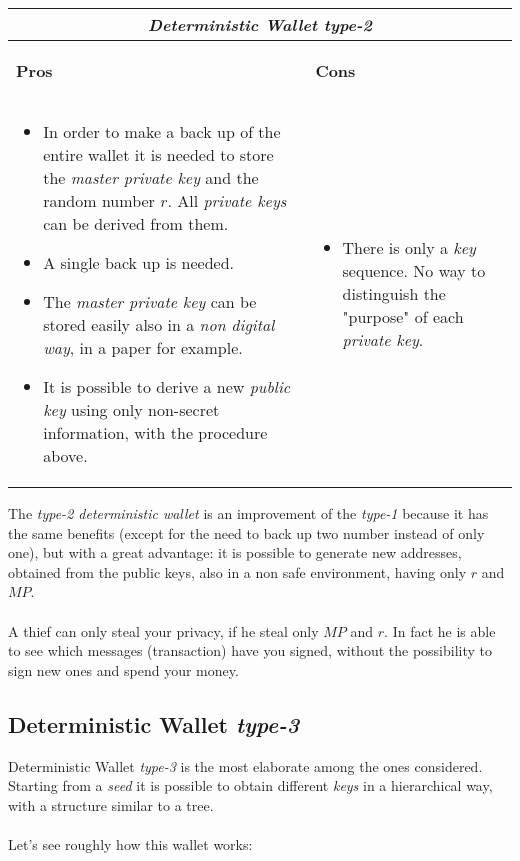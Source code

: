 \begin{center}
	\begin{tabular}{ |p{6cm}|p{6cm}|  }
		\hline
		\multicolumn{2}{|c|}{\textbf{\textit{Deterministic Wallet type-2}}} \\
		\hline \hline 
		\begin{center}
			\textbf{Pros}
		\end{center}&\begin{center}
			\textbf{Cons}
		\end{center}\\
		\hline
		\begin{itemize}
			\item In order to make a back up of the entire wallet it is needed to store the \textit{master private key} and the random number $r$. All \textit{private keys} can be derived from them.
			\item A single back up is needed.
			\item The \textit{master private key} can be stored easily also in a \textit{non digital way}, in a paper for example.
			\item It is possible to derive a new \textit{public key} using only non-secret information, with the procedure above.
		\end{itemize} &
		\begin{itemize}
			\item There is only a \textit{key} sequence. No way to distinguish the "purpose" of each \textit{private key}.
		\end{itemize}\\
		\hline
	\end{tabular}
\end{center}
The \textit{type-2 deterministic wallet} is an improvement of the \textit{type-1} because it has the same benefits (except for the need to back up two number instead of only one), but with a great advantage: it is possible to generate new addresses, obtained from the public keys, also in a non safe environment, having only $r$ and $MP$. 
\\ \\
A thief can only steal your privacy, if he steal only $MP$ and $r$. In fact he is able to see which messages (transaction) have you signed, without the possibility to sign new ones and spend your money.

\subsection{Deterministic Wallet \textit{type-3}}
Deterministic Wallet \textit{type-3} is the most elaborate among the ones considered. Starting from a \textit{seed} it is possible to obtain different \textit{keys} in a hierarchical way, with a structure similar to a tree. 
\\ \\
Let's see roughly how this wallet works:

